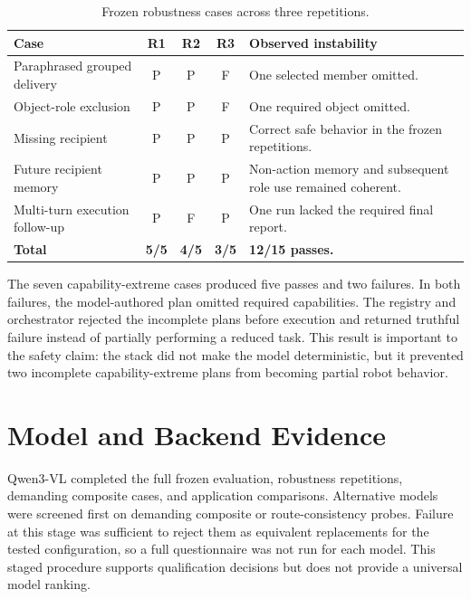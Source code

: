 \begin{table}[H]
\centering
\small
\renewcommand{\arraystretch}{1.12}
\caption{Frozen robustness cases across three repetitions.}
\label{tab:robustness-repetitions-final}
\begin{tabularx}{\textwidth}{@{}Xccc p{}@{}}
\toprule
\textbf{Case} & \textbf{R1} & \textbf{R2} & \textbf{R3} & \textbf{Observed instability}\\
\midrule
Paraphrased grouped delivery & P & P & F & One selected member omitted.\\
Object-role exclusion & P & P & F & One required object omitted.\\
Missing recipient & P & P & P & Correct safe behavior in the frozen repetitions.\\
Future recipient memory & P & P & P & Non-action memory and subsequent role use remained coherent.\\
Multi-turn execution follow-up & P & F & P & One run lacked the required final report.\\
\midrule
\textbf{Total} & \textbf{5/5} & \textbf{4/5} & \textbf{3/5} & \textbf{12/15 passes.}\\
\bottomrule
\end{tabularx}
\end{table}

The seven capability-extreme cases produced five passes and two failures. In both failures, the model-authored plan omitted required capabilities. The registry and orchestrator rejected the incomplete plans before execution and returned truthful failure instead of partially performing a reduced task. This result is important to the safety claim: the stack did not make the model deterministic, but it prevented two incomplete capability-extreme plans from becoming partial robot behavior.

\section{Model and Backend Evidence}

Qwen3-VL completed the full frozen evaluation, robustness repetitions, demanding composite cases, and application comparisons. Alternative models were screened first on demanding composite or route-consistency probes. Failure at this stage was sufficient to reject them as equivalent replacements for the tested configuration, so a full questionnaire was not run for each model. This staged procedure supports qualification decisions but does not provide a universal model ranking.

